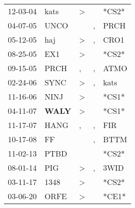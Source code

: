 \begin{supertabular}{p{0.07\textwidth}p{0.06\textwidth}p{0.02\textwidth}p{0.02\textwidth}p{0.06\textwidth}}
 12-03-04\textsuperscript{} &           kats\textsuperscript{} &     \textgreater &               &                            *CS2* \\
 04-07-05\textsuperscript{} &           UNCO\textsuperscript{} &                  &             , &           PRCH\textsuperscript{} \\
 05-12-05\textsuperscript{} &            haj\textsuperscript{} &     \textgreater &             , &           CRO1\textsuperscript{} \\
 08-25-05\textsuperscript{} &            EX1\textsuperscript{} &     \textgreater &               &                            *CS2* \\
 09-15-05\textsuperscript{} &           PRCH\textsuperscript{} &                , &             , &           ATMO\textsuperscript{} \\
 02-24-06\textsuperscript{} &           SYNC\textsuperscript{} &     \textgreater &             , &           kats\textsuperscript{} \\
 11-16-06\textsuperscript{} &           NINJ\textsuperscript{} &     \textgreater &               &                            *CS1* \\
 04-11-07\textsuperscript{} &  \textbf{WALY\textsuperscript{}} &     \textgreater &               &                            *CS1* \\
 11-17-07\textsuperscript{} &           HANG\textsuperscript{} &                , &             , &            FIR\textsuperscript{} \\
 10-17-08\textsuperscript{} &             FF\textsuperscript{} &                  &             , &           BTTM\textsuperscript{} \\
 11-02-13\textsuperscript{} &           PTBD\textsuperscript{} &                  &               &                            *CS2* \\
 08-01-14\textsuperscript{} &            PIG\textsuperscript{} &     \textgreater &             , &           3WID\textsuperscript{} \\
 03-11-17\textsuperscript{} &           1348\textsuperscript{} &     \textgreater &               &                            *CS2* \\
 03-06-20\textsuperscript{} &           ORFE\textsuperscript{} &     \textgreater &               &                            *CE1* \\
\end{supertabular}
